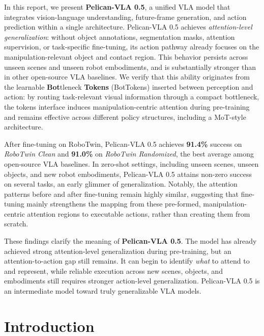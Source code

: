 \documentclass[a4paper,table]{extarticle}
\begin{document}
In this report, we present \textbf{Pelican-VLA 0.5}, a unified VLA model that integrates vision-language understanding, future-frame generation, and action prediction within a single architecture. Pelican-VLA 0.5 achieves \emph{attention-level generalization}: without object annotations, segmentation masks, attention supervision, or task-specific fine-tuning, its action pathway already focuses on the manipulation-relevant object and contact region. This behavior persists across unseen scenes and unseen robot embodiments, and is substantially stronger than in other open-source VLA baselines.  We verify that this ability originates from the learnable \textbf{Bot}tleneck \textbf{Tokens} (BotTokens) inserted between perception and action: by routing task-relevant visual information through a compact bottleneck, the tokens interface induces manipulation-centric attention during pre-training and remains effective across different policy structures, including a MoT-style architecture.

After fine-tuning on RoboTwin, Pelican-VLA 0.5 achieves \textbf{91.4\%} success on \emph{RoboTwin Clean} and \textbf{91.0\%} on \emph{RoboTwin Randomized}, the best average among open-source VLA baselines.  In zero-shot settings, including unseen scenes, unseen objects, and new robot embodiments, Pelican-VLA 0.5 attains non-zero success on several tasks, an early glimmer of generalization. Notably, the attention patterns before and after fine-tuning remain highly similar, suggesting that fine-tuning mainly strengthens the mapping from these pre-formed, manipulation-centric attention regions to executable actions, rather than creating them from scratch.

These findings clarify the meaning of \textbf{Pelican-VLA 0.5}. The model has already achieved strong attention-level generalization during pre-training, but an attention-to-action gap still remains. It can begin to identify \emph{what} to attend to and represent, while reliable execution across new scenes, objects, and embodiments still requires stronger action-level generalization. Pelican-VLA 0.5 is an intermediate model toward truly generalizable VLA models.

\section{Introduction}
\end{document}
